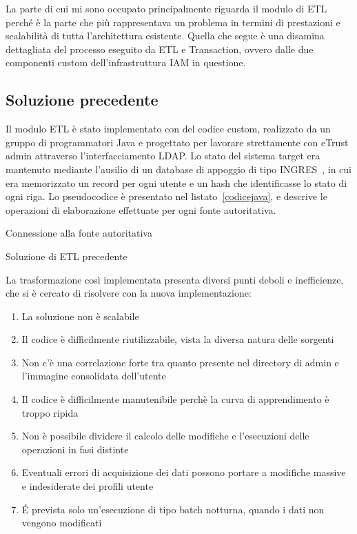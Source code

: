 La parte di cui mi sono occupato principalmente riguarda il modulo di
ETL perché è la parte che più rappresentava un problema in termini di
prestazioni e scalabilità di tutta l'architettura esistente.
Quella che segue è una disamina dettagliata del processo eseguito da ETL e
Transaction, ovvero dalle due componenti custom dell’infrastruttura IAM in
questione.  

\subsection{Soluzione precedente}
Il modulo ETL è stato implementato con del codice custom, realizzato da un
gruppo di programmatori Java e progettato per lavorare strettamente con eTrust
admin attraverso l'interfacciamento LDAP.
Lo stato del sistema target era mantenuto mediante l'ausilio di un database di
appoggio di tipo INGRES~\cite{ingres}, in cui era memorizzato un record per ogni
utente e un hash che identificasse lo stato di ogni riga.
Lo pseudocodice è presentato nel listato~\ref{codicejava}, e descrive le
operazioni di elaborazione effettuate per ogni fonte autoritativa.

\begin{algorithm}

Connessione alla fonte autoritativa\;

\label{codicejava}
\caption{Soluzione di ETL precedente}
\end{algorithm}

La trasformazione così implementata presenta diversi punti deboli e
inefficienze, che si è cercato di risolvere con la nuova implementazione:

\begin{enumerate}
\item La soluzione non è scalabile
\item Il codice è difficilmente riutilizzabile, vista la diversa natura delle
sorgenti
\item Non c'è una correlazione forte tra quanto presente nel directory di admin
e l'immagine consolidata dell'utente
\item Il codice è difficilmente manutenibile perchè la curva di apprendimento è
troppo ripida
\item Non è possibile dividere il calcolo delle modifiche e l'esecuzioni delle
operazioni in fasi distinte
\item Eventuali errori di acquisizione dei dati possono portare a modifiche
massive e indesiderate dei profili utente
\item \'E prevista solo un'esecuzione di tipo batch notturna, quando i dati non
vengono modificati
\end{enumerate}

